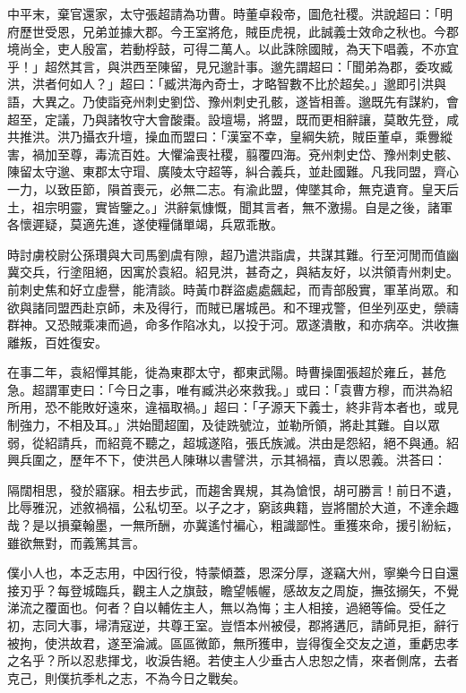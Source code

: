 \begin{pinyinscope}
中平末，棄官還家，太守張超請為功曹。時董卓殺帝，圖危社稷。洪說超曰：「明府歷世受恩，兄弟並據大郡。今王室將危，賊臣虎視，此誠義士效命之秋也。今郡境尚全，吏人殷富，若動桴鼓，可得二萬人。以此誅除國賊，為天下唱義，不亦宜乎！」超然其言，與洪西至陳留，見兄邈計事。邈先謂超曰：「聞弟為郡，委攻臧洪，洪者何如人？」超曰：「臧洪海內奇士，才略智數不比於超矣。」邈即引洪與語，大異之。乃使詣兗州刺史劉岱、豫州刺史孔骸，遂皆相善。邈既先有謀約，會超至，定議，乃與諸牧守大會酸棗。設壇場，將盟，既而更相辭讓，莫敢先登，咸共推洪。洪乃攝衣升壇，操血而盟曰：「漢室不幸，皇綱失統，賊臣董卓，乘釁縱害，禍加至尊，毒流百姓。大懼淪喪社稷，翦覆四海。兗州刺史岱、豫州刺史骸、陳留太守邈、東郡太守瑁、廣陵太守超等，糾合義兵，並赴國難。凡我同盟，齊心一力，以致臣節，隕首喪元，必無二志。有渝此盟，俾墜其命，無克遺育。皇天后土，祖宗明靈，實皆鑒之。」洪辭氣慷慨，聞其言者，無不激揚。自是之後，諸軍各懷遲疑，莫適先進，遂使糧儲單竭，兵眾乖散。

時討虜校尉公孫瓚與大司馬劉虞有隙，超乃遣洪詣虞，共謀其難。行至河閒而值幽冀交兵，行塗阻絕，因寓於袁紹。紹見洪，甚奇之，與結友好，以洪領青州刺史。前刺史焦和好立虛譽，能清談。時黃巾群盜處處飆起，而青部殷實，軍革尚眾。和欲與諸同盟西赴京師，未及得行，而賊已屠城邑。和不理戎警，但坐列巫史，禜禱群神。又恐賊乘凍而過，命多作陷冰丸，以投于河。眾遂潰散，和亦病卒。洪收撫離叛，百姓復安。

在事二年，袁紹憚其能，徙為東郡太守，都東武陽。時曹操圍張超於雍丘，甚危急。超謂軍吏曰：「今日之事，唯有臧洪必來救我。」或曰：「袁曹方穆，而洪為紹所用，恐不能敗好遠來，違福取禍。」超曰：「子源天下義士，終非背本者也，或見制強力，不相及耳。」洪始聞超圍，及徒跣號泣，並勒所領，將赴其難。自以眾弱，從紹請兵，而紹竟不聽之，超城遂陷，張氏族滅。洪由是怨紹，絕不與通。紹興兵圍之，歷年不下，使洪邑人陳琳以書譬洪，示其禍福，責以恩義。洪荅曰：

隔闊相思，發於寤寐。相去步武，而趨舍異規，其為愴恨，胡可勝言！前日不遺，比辱雅況，述敘禍福，公私切至。以子之才，窮該典籍，豈將闇於大道，不達余趣哉？是以損棄翰墨，一無所酬，亦冀遙忖褊心，粗識鄙性。重獲來命，援引紛紜，雖欲無對，而義篤其言。

僕小人也，本乏志用，中因行役，特蒙傾蓋，恩深分厚，遂竊大州，寧樂今日自還接刃乎？每登城臨兵，觀主人之旗鼓，瞻望帳幄，感故友之周旋，撫弦搦矢，不覺涕流之覆面也。何者？自以輔佐主人，無以為悔；主人相接，過絕等倫。受任之初，志同大事，埽清寇逆，共尊王室。豈悟本州被侵，郡將遘厄，請師見拒，辭行被拘，使洪故君，遂至淪滅。區區微節，無所獲申，豈得復全交友之道，重虧忠孝之名乎？所以忍悲揮戈，收淚告絕。若使主人少垂古人忠恕之情，來者側席，去者克己，則僕抗季札之志，不為今日之戰矣。


\end{pinyinscope}

